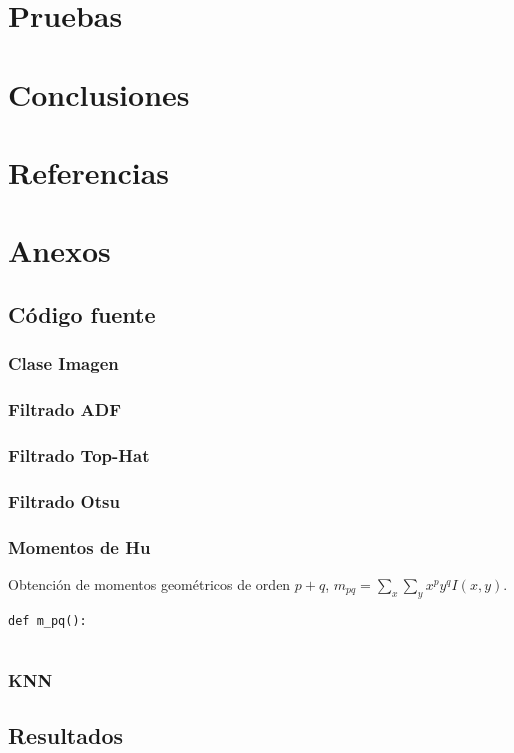 \documentclass[letter]{article}
\begin{document}
\section{Pruebas}
\label{sec:org0dc7478}

\section{Conclusiones}
\label{sec:orgfbd3edc}

\section{Referencias}
\label{sec:org6670398}

\section{Anexos}
\label{sec:orge896747}
\subsection{Código fuente}
\label{sec:org16c5aab}
\subsubsection{Clase Imagen}
\label{sec:orgf17edff}
\subsubsection{Filtrado ADF}
\label{sec:org176b23f}
\subsubsection{Filtrado Top-Hat}
\label{sec:orge63acb7}
\subsubsection{Filtrado Otsu}
\label{sec:orgd46eba9}
\subsubsection{Momentos de Hu}
\label{sec:orge8ffbd3}
Obtención de momentos geométricos de orden \(p+q\), \(m_{pq} = \sum_x \sum_y x^p y^q I(x, y)\).

\begin{verbatim}
def m_pq():
   
\end{verbatim}

\subsubsection{KNN}
\label{sec:org85c859e}

\subsection{Resultados}
\label{sec:orgb6a7c2a}
\end{document}

